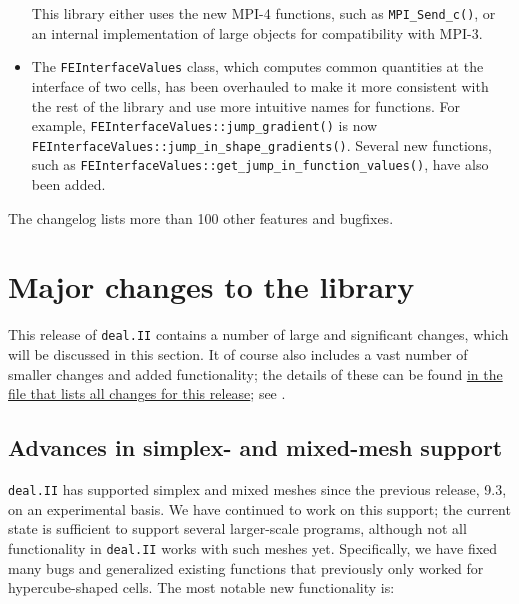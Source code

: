 \documentclass{ansarticle-preprint}
\newcommand{\specialword}[1]{\texttt{#1}}
\newcommand{\dealii}{{\specialword{deal.II}}\xspace}
\begin{document}
\begin{itemize}
  This library either uses the new MPI-4 functions, such as \texttt{MPI\_Send\_c()}, or an internal implementation of large objects for
  compatibility with MPI-3.
  \item The \texttt{FEInterfaceValues} class, which computes common quantities at the interface of two cells, has been overhauled to make it
  more consistent with the rest of the library and use more intuitive names for functions. For example,
  \texttt{FEInterfaceValues::jump\_gradient()} is now \texttt{FEInterfaceValues::jump\_in\_shape\_gradients()}. Several new
  functions, such as \texttt{FEInterfaceValues::get\_jump\_in\_function\_values()}, have also been added.
\end{itemize}
%
The changelog lists more than 100 other features and bugfixes.




\section{Major changes to the library}
\label{sec:major}

This release of \dealii{} contains a number of large and significant changes,
which will be discussed in this section.
It of course also includes a
vast number of smaller changes and added functionality; the details of these
can be found
\href{https://dealii.org/developer/doxygen/deal.II/changes_between_9_3_0_and_9_4_0.html}
{in the file that lists all changes for this release}; see \cite{changes94}.


\subsection{Advances in simplex- and mixed-mesh support}\label{sec:simplex}

\dealii{} has supported simplex and mixed meshes since the previous
release, 9.3, on an experimental basis.
We have continued to work on this support; the current state is
sufficient to support several larger-scale programs, although not all
functionality in \dealii{} works with such meshes yet. Specifically,
we have fixed many bugs and generalized existing functions that
previously only worked for hypercube-shaped cells. The most notable
new functionality is:
\end{document}

